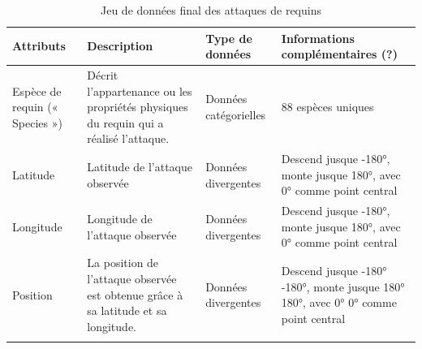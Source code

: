 \documentclass{article}
\begin{document}
\begin{longtable}[h]{|p{} | p{}|p{}|p{}|}
	\hline
	Attributs                      & Description                                                                          & Type de données       & Informations complémentaires (?)                                                    \\ \hline
	Espèce de requin (« Species ») & Décrit l’appartenance ou les propriétés physiques du requin qui a réalisé l’attaque. & Données catégorielles & 88 espèces uniques                                                                  \\ \hline
	Latitude                       & Latitude de l’attaque observée                                                       & Données divergentes   & Descend jusque -\ang{180}, monte jusque \ang{180}, avec \ang{0} comme point central \\ \hline
	Longitude                      & Longitude de l’attaque observée                                                      & Données divergentes   & Descend jusque -\ang{180}, monte jusque \ang{180}, avec \ang{0} comme point central \\ \hline
	Position                       & La position de l’attaque observée est obtenue grâce à sa latitude et sa longitude.   & Données divergentes   &
	Descend jusque -\ang{180} -\ang{180}, monte jusque \ang{180} \ang{180}, avec \ang{0} \ang{0} comme point central                                                                                                                    \\ \hline
	\caption{\label{attaqueRequins} Jeu de données final des attaques de requins}
\end{longtable}
\clearpage
\end{document}

